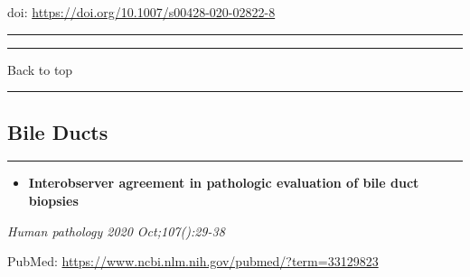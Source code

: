 \documentclass[
]{article}
\providecommand{\tightlist}{%
  \setlength{\itemsep}{0pt}\setlength{\parskip}{0pt}}
\begin{document}
doi: \url{https://doi.org/10.1007/s00428-020-02822-8}

\begin{center}\rule{0.5\linewidth}{0.5pt}\end{center}

\begin{center}\rule{0.5\linewidth}{0.5pt}\end{center}

Back to top

\begin{center}\rule{0.5\linewidth}{0.5pt}\end{center}

\pagebreak

\hypertarget{bileducts}{%
\subsection{Bile Ducts}\label{bileducts}}

\begin{center}\rule{0.5\linewidth}{0.5pt}\end{center}

\begin{itemize}
\tightlist
\item
  \textbf{Interobserver agreement in pathologic evaluation of bile duct
  biopsies}
\end{itemize}

\emph{Human pathology 2020 Oct;107():29-38}

PubMed: \url{https://www.ncbi.nlm.nih.gov/pubmed/?term=33129823}
\end{document}
